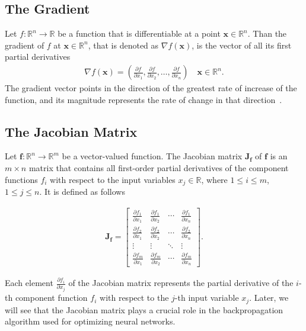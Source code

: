 \subsection{The Gradient}
\label{sec:gradient}

Let \( f: \mathbb{R}^n \to \mathbb{R} \) be a function  that is differentiable at a point $ \mathbf{x} \in \mathbb{R}^n  $.
Than the gradient of $ f $ at $ \mathbf{x} \in \mathbb{R}^n$, that is denoted as $ \nabla f(\mathbf{x}) $, is the vector of all its first partial derivatives
\begin{align}
\nabla f(\mathbf{x}) = \left( \frac{\partial f}{\partial x_1}, \frac{\partial f}{\partial x_2}, \ldots, \frac{\partial f}{\partial x_n} \right) \quad \mathbf{x} \in \mathbb{R}^n.
\end{align}
The gradient vector points in the direction of the greatest rate of increase of the function, and its magnitude represents the rate of change in that direction~\cite{bachman2007}.


\subsection{The Jacobian Matrix}
\label{sec:jaocobian}

Let $ \mathbf{f}: \mathbb{R}^n \to \mathbb{R}^m $ be a vector-valued function.
The Jacobian matrix \( \mathbf{J_f} \) of \( \mathbf{f} \) is an \( m \times n \) matrix that contains all first-order partial derivatives of the component functions \( f_i \) with respect to the input variables \( x_j  \in \mathbb{R} \), where $1 \leq i \leq m$, $1 \leq j \leq n$. It is defined as follows

\begin{align}
\mathbf{J_f} = \begin{bmatrix}
\frac{\partial f_1}{\partial x_1} & \frac{\partial f_1}{\partial x_2} & \cdots & \frac{\partial f_1}{\partial x_n} \\
\frac{\partial f_2}{\partial x_1} & \frac{\partial f_2}{\partial x_2} & \cdots & \frac{\partial f_2}{\partial x_n} \\
\vdots & \vdots & \ddots & \vdots \\
\frac{\partial f_m}{\partial x_1} & \frac{\partial f_m}{\partial x_2} & \cdots & \frac{\partial f_m}{\partial x_n}
\end{bmatrix}.
\end{align}


Each element \( \frac{\partial f_i}{\partial x_j} \) of the Jacobian matrix represents the partial derivative of the \( i \)-th component function \( f_i \) with respect to the \( j \)-th input variable \( x_j \).
Later, we will see that the Jacobian matrix plays a crucial role in the backpropagation algorithm used for optimizing neural networks.
